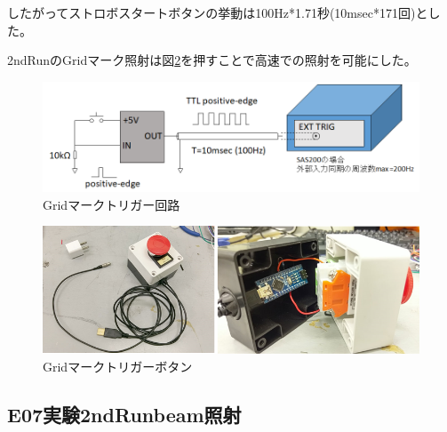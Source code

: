 \documentclass[12pt,a4paper]{jarticle}
\begin{document}
したがってストロボスタートボタンの挙動は100Hz*1.71秒(10msec*171回)とした。
\par
2ndRunのGridマーク照射は図\ref{fig:grid_botan}を押すことで高速での照射を可能にした。
\begin{figure}[htbp]
  \centering
     \includegraphics[width=120mm]{grid_kairo.png}
  \caption{Gridマークトリガー回路\label{fig:grid_kairo}}
\end{figure}
\begin{figure}[htbp]
  \centering
     \includegraphics[width=120mm]{grid_botan.png}
  \caption{Gridマークトリガーボタン\label{fig:grid_botan}}
\end{figure}
\newpage
\subsection{E07実験2ndRunbeam照射}
\end{document}
